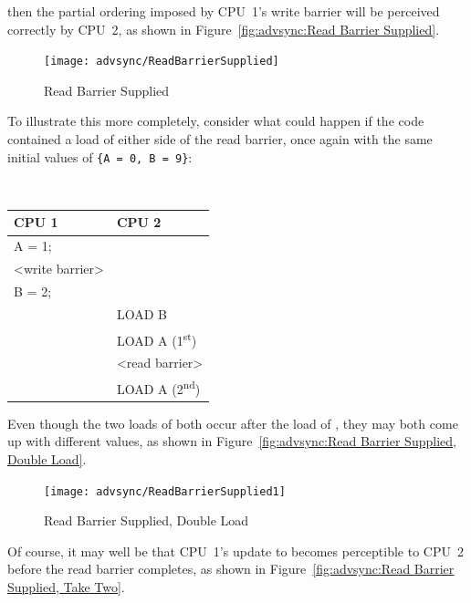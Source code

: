 then the partial ordering imposed by CPU~1's write barrier will be
perceived correctly by CPU~2, as shown in
Figure~\ref{fig:advsync:Read Barrier Supplied}.

\begin{figure}[htb]
\begin{center}
\texttt{[image: advsync/ReadBarrierSupplied]}
\end{center}
\caption{Read Barrier Supplied}
\end{figure}

To illustrate this more completely, consider what could happen if the code
contained a load of  either side of the read barrier, once again
with the same initial values of
{\tt \{A = 0, B = 9\}}:

\vspace{5pt}
\begin{minipage}[t]{\columnwidth}
\tt
\scriptsize
\begin{tabular}{l|p{1.5in}}
	CPU 1 &		CPU 2 \\
	\hline
	A = 1; & \\
	<write barrier> & \\
	B = 2; & \\
		&	LOAD B \\
		&	LOAD A (1\textsuperscript{st}) \\
		&	<read barrier> \\
		&	LOAD A (2\textsuperscript{nd}) \\
\end{tabular}
\end{minipage}
\vspace{5pt}

Even though the two loads of 
both occur after the load of , they may both
come up with different values, as shown in
Figure~\ref{fig:advsync:Read Barrier Supplied, Double Load}.

\begin{figure}[htb]
\begin{center}
\texttt{[image: advsync/ReadBarrierSupplied1]}
\end{center}
\caption{Read Barrier Supplied, Double Load}
\end{figure}

Of course, it may well be that CPU~1's update to  becomes perceptible
to CPU~2 before the read barrier completes, as shown in
Figure~\ref{fig:advsync:Read Barrier Supplied, Take Two}.

